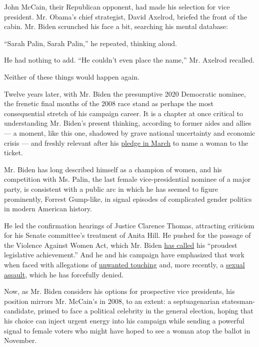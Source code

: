 John McCain, their Republican opponent, had made his selection for vice
president. Mr. Obama's chief strategist, David Axelrod, briefed the
front of the cabin. Mr. Biden scrunched his face a bit, searching his
mental database:

``Sarah Palin, Sarah Palin,'' he repeated, thinking aloud.

He had nothing to add. ``He couldn't even place the name,'' Mr. Axelrod
recalled.

Neither of these things would happen again.

Twelve years later, with Mr. Biden the presumptive 2020 Democratic
nominee, the frenetic final months of the 2008 race stand as perhaps the
most consequential stretch of his campaign career. It is a chapter at
once critical to understanding Mr. Biden's present thinking, according
to former aides and allies --- a moment, like this one, shadowed by
grave national uncertainty and economic crisis --- and freshly relevant
after his
\href{https://www.nytimes.com/2020/03/15/us/politics/joe-biden-female-vice-president.html}{pledge
in March} to name a woman to the ticket.

Mr. Biden has long described himself as a champion of women, and his
competition with Ms. Palin, the last female vice-presidential nominee of
a major party, is consistent with a public arc in which he has seemed to
figure prominently, Forrest Gump-like, in signal episodes of complicated
gender politics in modern American history.

He led the confirmation hearings of Justice Clarence Thomas, attracting
criticism for his Senate committee's treatment of Anita Hill. He pushed
for the passage of the Violence Against Women Act, which Mr. Biden
\href{https://obamawhitehouse.archives.gov/blog/2014/09/13/vice-president-biden-20-years-ago-today}{has
called} his ``proudest legislative achievement.'' And he and his
campaign have emphasized that work when faced with allegations of
\href{https://www.nytimes.com/2019/04/02/us/politics/joe-biden-women-me-too.html}{unwanted
touching} and, more recently, a
\href{https://www.nytimes.com/2020/04/12/us/politics/joe-biden-tara-reade-sexual-assault-complaint.html}{sexual
assault}, which he has forcefully denied.

Now, as Mr. Biden considers his options for prospective vice presidents,
his position mirrors Mr. McCain's in 2008, to an extent: a
septuagenarian statesman-candidate, primed to face a political celebrity
in the general election, hoping that his choice can inject urgent energy
into his campaign while sending a powerful signal to female voters who
might have hoped to see a woman atop the ballot in November.

